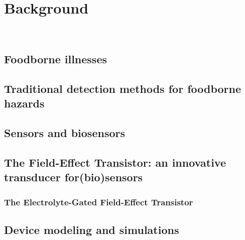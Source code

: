 \chapter{Background}
\label{cap:chapter1}

\newpage
\thispagestyle{empty}
\ %
\newpage


\section{Foodborne illnesses}
\label{sec:foodborne_hazards}




\section{Traditional detection methods for foodborne hazards}
\label{sec:traditional_detection}


 

\section{Sensors and biosensors}
\label{sec:sensors}




\section{The Field-Effect Transistor: an innovative transducer for(bio)sensors}
\label{sec:FET}




\subsection{The Electrolyte-Gated Field-Effect Transistor}
\label{sec:EGFET}




\section{Device modeling and simulations}
\label{sec:simulations}




\newpage
\thispagestyle{empty}
\ %
\newpage